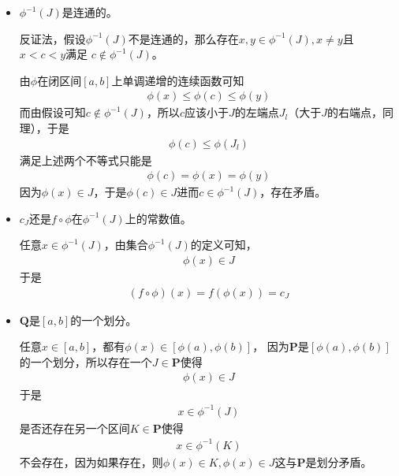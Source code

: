 \documentclass{article}
\begin{document}
\begin{itemize}
  \item $\phi^{-1}(J)$是连通的。

        反证法，假设$\phi^{-1}(J)$不是连通的，那么存在$x, y \in \phi^{-1}(J),x \neq y$且$x < c < y$满足
        $c \notin \phi^{-1}(J)$。

        由$\phi$在闭区间$[a, b]$上单调递增的连续函数可知
        \begin{align*}
          \phi(x) \leq \phi(c) \leq \phi(y)
        \end{align*}
        而由假设可知$c \notin \phi^{-1}(J)$，所以$c$应该小于$J$的左端点$J_l$（大于$J$的右端点，同理），于是
        \begin{align*}
          \phi(c) \leq \phi(J_l)
        \end{align*}
        满足上述两个不等式只能是
        \begin{align*}
          \phi(c) = \phi(x) = \phi(y)
        \end{align*}
        因为$\phi(x) \in J$，于是$\phi(c) \in J$进而$c \in \phi^{-1}(J)$，存在矛盾。

  \item $c_J$还是$f \circ \phi$在$\phi^{-1}(J)$上的常数值。

        任意$x \in \phi^{-1}(J)$，由集合$\phi^{-1}(J)$的定义可知，
        \begin{align*}
          \phi(x) \in J
        \end{align*}
        于是
        \begin{align*}
          (f \circ \phi)(x) = f(\phi(x)) = c_J
        \end{align*}

  \item $\textbf{Q}$是$[a,b]$的一个划分。

        任意$x \in [a, b]$，都有$\phi(x) \in [\phi(a), \phi(b)]$，
        因为$\textbf{P}$是$[\phi(a), \phi(b)]$的一个划分，所以存在一个$J \in \textbf{P}$使得
        \begin{align*}
          \phi(x) \in J
        \end{align*}
        于是
        \begin{align*}
          x \in \phi^{-1}(J)
        \end{align*}
        是否还存在另一个区间$K \in \textbf{P}$使得
        \begin{align*}
          x \in \phi^{-1}(K)
        \end{align*}
        不会存在，因为如果存在，则$\phi(x) \in K, \phi(x) \in J$这与$\textbf{P}$是划分矛盾。


\end{itemize}
\end{document}
